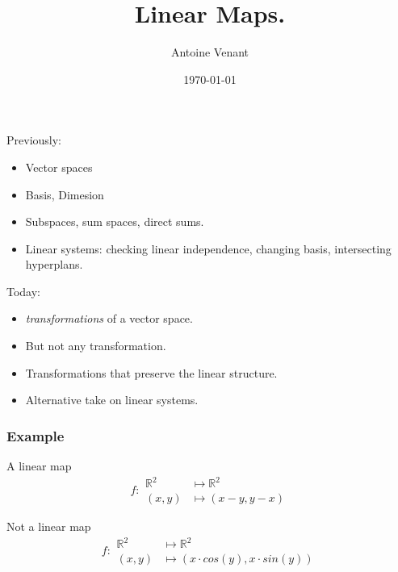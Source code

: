 \documentclass{beamer}
\newcommand{\hidden}[1]{}
\begin{document}
\title{Linear Maps.} 
\author{Antoine Venant}
\date{\today}
\maketitle


\begin{frame}{Previously:}
  \begin{itemize}
  \item Vector spaces
  \item Basis, Dimesion
  \item Subspaces, sum spaces, direct sums.
  \item Linear systems: checking linear independence, changing basis, intersecting hyperplans.
  \end{itemize}
\end{frame}

\begin{frame}{Today:}
  \begin{itemize}
  \item \emph{transformations} of a vector space.
  \item But not any transformation.
  \item Transformations that preserve the linear structure.
  \item Alternative take on linear systems.
  \end{itemize}
\end{frame}

\hidden{
\begin{exampleblock}{Example:}
  \begin{center}
            
    \end{center}
\end{exampleblock}
}

\begin{frame}
  \frametitle{Example}
  \begin{exampleblock}{A linear map}
    \[f: \begin{aligned} \mathbb{R}^2 &\mapsto \mathbb{R}^2\\ (x,y) &\mapsto (x - y, y - x) \end{aligned}\]  
  \end{exampleblock}

  \begin{exampleblock}{Not a linear map}
    \[f: \begin{aligned} \mathbb{R}^2 &\mapsto \mathbb{R}^2\\ (x,y) &\mapsto (x \cdot cos(y), x \cdot sin(y)) \end{aligned}\]  
  \end{exampleblock}
\end{frame}
\end{document}
